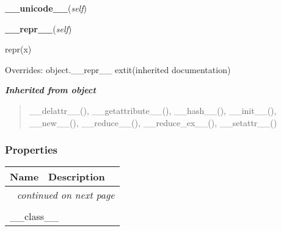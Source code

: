     \label{biblio:webquery:impl:ReprObj:__unicode__}

    \vspace{0.5ex}

\hspace{.8\funcindent}\begin{boxedminipage}{\funcwidth}

    \raggedright \textbf{\_\_unicode\_\_}(\textit{self})

\setlength{\parskip}{2ex}
\setlength{\parskip}{1ex}
    \end{boxedminipage}

    \vspace{0.5ex}

\hspace{.8\funcindent}\begin{boxedminipage}{\funcwidth}

    \raggedright \textbf{\_\_repr\_\_}(\textit{self})

\setlength{\parskip}{2ex}
    repr(x)

\setlength{\parskip}{1ex}
      Overrides: object.\_\_repr\_\_ 	extit{(inherited documentation)}

    \end{boxedminipage}


\large{\textbf{\textit{Inherited from object}}}

\begin{quote}
\_\_delattr\_\_(), \_\_getattribute\_\_(), \_\_hash\_\_(), \_\_init\_\_(), \_\_new\_\_(), \_\_reduce\_\_(), \_\_reduce\_ex\_\_(), \_\_setattr\_\_()
\end{quote}


  \subsubsection{Properties}

    \vspace{-1cm}
\hspace{\varindent}\begin{longtable}{|p{\varnamewidth}|p{\vardescrwidth}|l}
\cline{1-2}
\cline{1-2} \centering \textbf{Name} & \centering \textbf{Description}& \\
\cline{1-2}
\endhead\cline{1-2}\multicolumn{3}{r}{\small\textit{continued on next page}}\\\endfoot\cline{1-2}
\endlastfoot\multicolumn{2}{|l|}{\textit{Inherited from object}}\\
\multicolumn{2}{|p{\varwidth}|}{\raggedright \_\_class\_\_}\\
\cline{1-2}
\end{longtable}

